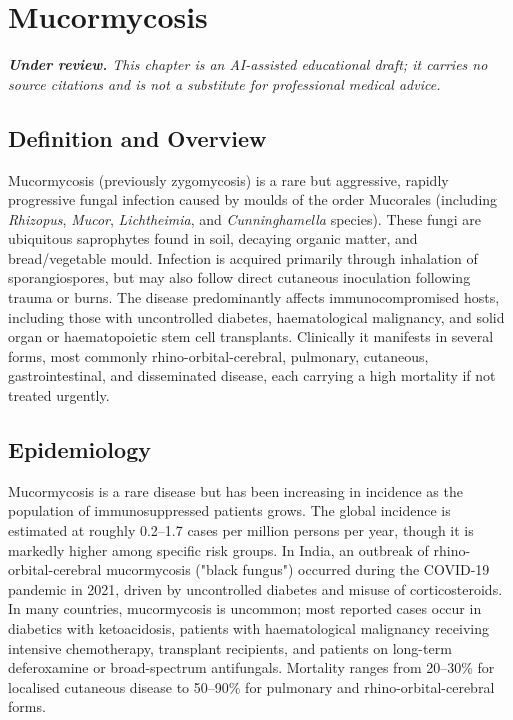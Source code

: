 \chapter{Mucormycosis}

\medskip
\noindent\textit{\textbf{Under review.} This chapter is an AI-assisted educational draft; it carries no source citations and is not a substitute for professional medical advice.}

\section*{Definition and Overview}
Mucormycosis (previously zygomycosis) is a rare but aggressive, rapidly progressive fungal infection caused by moulds of the order Mucorales (including \textit{Rhizopus}, \textit{Mucor}, \textit{Lichtheimia}, and \textit{ Cunninghamella} species). These fungi are ubiquitous saprophytes found in soil, decaying organic matter, and bread/vegetable mould. Infection is acquired primarily through inhalation of sporangiospores, but may also follow direct cutaneous inoculation following trauma or burns. The disease predominantly affects immunocompromised hosts, including those with uncontrolled diabetes, haematological malignancy, and solid organ or haematopoietic stem cell transplants. Clinically it manifests in several forms, most commonly rhino-orbital-cerebral, pulmonary, cutaneous, gastrointestinal, and disseminated disease, each carrying a high mortality if not treated urgently.

\section*{Epidemiology}
Mucormycosis is a rare disease but has been increasing in incidence as the population of immunosuppressed patients grows. The global incidence is estimated at roughly 0.2--1.7 cases per million persons per year, though it is markedly higher among specific risk groups. In India, an outbreak of rhino-orbital-cerebral mucormycosis ("black fungus") occurred during the COVID-19 pandemic in 2021, driven by uncontrolled diabetes and misuse of corticosteroids. In many countries, mucormycosis is uncommon; most reported cases occur in diabetics with ketoacidosis, patients with haematological malignancy receiving intensive chemotherapy, transplant recipients, and patients on long-term deferoxamine or broad-spectrum antifungals. Mortality ranges from 20--30\% for localised cutaneous disease to 50--90\% for pulmonary and rhino-orbital-cerebral forms.

